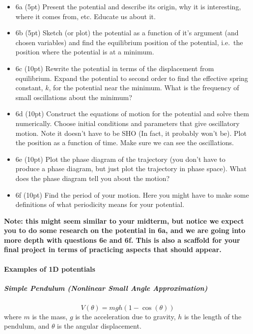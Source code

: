 \documentclass[11pt]{article}
\providecommand{\tightlist}{%
      \setlength{\itemsep}{0pt}\setlength{\parskip}{0pt}}
\begin{document}
\begin{itemize}
\tightlist
\item
  6a (5pt) Present the potential and describe its origin, why it is
  interesting, where it comes from, etc. Educate us about it.
\item
  6b (5pt) Sketch (or plot) the potential as a function of it's argument
  (and chosen variables) and find the equilibrium position of the
  potential, i.e.~the position where the potential is at a minimum.
\item
  6c (10pt) Rewrite the potential in terms of the displacement from
  equilibrium. Expand the potential to second order to find the
  effective spring constant, \(k\), for the potential near the minimum.
  What is the frequency of small oscillations about the minimum?
\item
  6d (10pt) Construct the equations of motion for the potential and
  solve them numerically. Choose initial conditions and parameters that
  give oscillatory motion. Note it doesn't have to be SHO (In fact, it
  probably won't be). Plot the position as a function of time. Make sure
  we can see the oscillations.
\item
  6e (10pt) Plot the phase diagram of the trajectory (you don't have to
  produce a phase diagram, but just plot the trajectory in phase space).
  What does the phase diagram tell you about the motion?
\item
  6f (10pt) Find the period of your motion. Here you might have to make
  some definitions of what periodicity means for your potential.
\end{itemize}

\textbf{Note: this might seem similar to your midterm, but notice we
expect you to do some research on the potential in 6a, and we are going
into more depth with questions 6e and 6f. This is also a scaffold for
your final project in terms of practicing aspects that should appear.}

\paragraph{Examples of 1D potentials}\label{examples-of-1d-potentials}

\subparagraph{Simple Pendulum (Nonlinear Small Angle
Approximation)}\label{simple-pendulum-nonlinear-small-angle-approximation}

\[ V(\theta) = mgh(1 - \cos(\theta)) \] where \(m\) is the mass, \(g\)
is the acceleration due to gravity, \(h\) is the length of the pendulum,
and \(\theta\) is the angular displacement.
\end{document}
